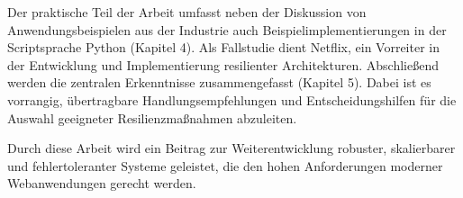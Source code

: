 Der praktische Teil der Arbeit umfasst neben der Diskussion von Anwendungsbeispielen aus der Industrie auch
Beispielimplementierungen in der Scriptsprache Python (Kapitel 4).
Als Fallstudie dient Netflix, ein Vorreiter in der Entwicklung und Implementierung resilienter Architekturen. %
Abschließend werden die zentralen Erkenntnisse zusammengefasst (Kapitel 5).
Dabei ist es vorrangig, übertragbare Handlungsempfehlungen und Entscheidungshilfen
für die Auswahl geeigneter Resilienzmaßnahmen abzuleiten.

Durch diese Arbeit wird ein Beitrag zur Weiterentwicklung robuster, skalierbarer und fehlertoleranter Systeme geleistet,
die den hohen Anforderungen moderner Webanwendungen gerecht werden.

